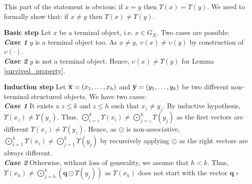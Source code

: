 \documentclass[twoside,11pt]{article}
\newenvironment{proof}{{\bf Proof:}}{$\square$ }
\def\vec#1{\mathbf{#1}}
\def\substr#1{{\bf\overline{#1}}}
\def\df{\Upsilon}
\def\basicdf{\upsilon}
\def\mo{\odot}
\def\Mo{\bigodot}
\begin{document}
\begin{proof}
This part of the statement is obvious: if $x = y$ then $\df(x)=\df(y)$.
We need to formally show that: if $x \neq y$ then $\df(x)\neq\df(y)$.

\textbf{Basic step}
Let $x$ be a terminal object, i.e. $x \in G_X$. Two cases are possible:\\
\textbf{\emph{Case 1}} $y$ is a terminal object too. As $x \neq y$, $\basicdf(x) \neq \basicdf(y)$  by construction of $\basicdf(\cdot)$.\\
\textbf{\emph{Case 2}} 
$y$ is not a terminal object. Hence, $\basicdf(x) \neq \df(y)$ for Lemma \ref{survived_property}.

\textbf{Induction step}
Let $\substr x = (x_1,\ldots,x_h)$ and $\substr y = (y_1,\ldots,y_k)$ be two different non-terminal structured objects. We have two cases:\\
\textbf{\emph{Case 1}} It exists a $z\leq k$ and $z\leq h$ such that $x_z \neq y_z$. By inductive hypothesis, $\df(x_z) \neq \df(y_z)$. Thus, $\Mo_{i=z}^k\df(x_i) \neq \Mo_{j=z}^h\df(y_j)$ as the first vectors are different $\df(x_z) \neq \df(y_z)$. Hence, 
as $\mo$ is non-associative, $\Mo_{i=1}^k\df(x_i) \neq \Mo_{j=1}^h\df(y_j)$ by recursively applying $\mo$ as the right vectors are always different.\\
\textbf{\emph{Case 2}} Otherwise, without loss of generality, we assume that $h < k$. Thus, $\df(x_h) \neq   \Mo_{j=h}^k\left(\vec q \mo \df(y_j)\right)$  as $\df(x_h)$ does not start with the vector $\vec q$ \end{proof}
\end{document}
